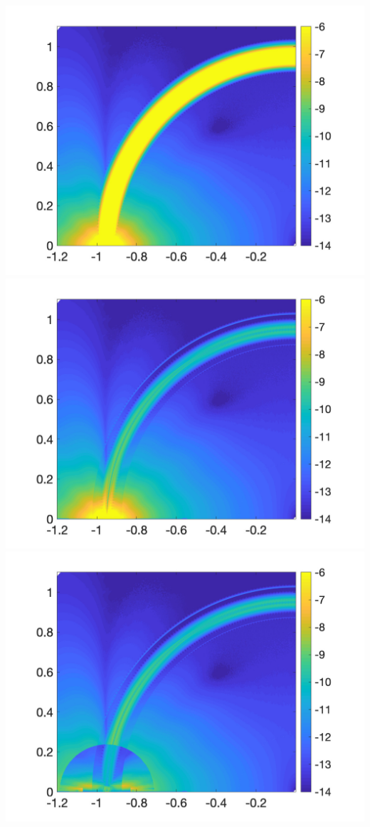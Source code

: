\includegraphics[trim=40 20 40 10, clip, width=2.5truein]{figs/fig200a4} 
\includegraphics[trim=40 20 40 10, clip, width=2.5truein]{figs/fig200b4} 
\includegraphics[trim=40 20 40 10, clip, width=2.5truein]{figs/fig200c4}\\ 
